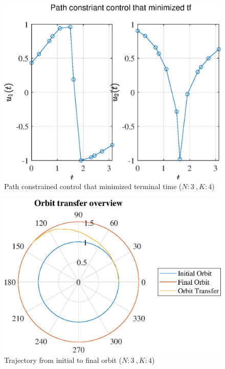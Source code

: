 \documentclass[]{article}
\begin{document}
	\begin{figure}
		\centering
		\includegraphics[scale=0.75]{path_N3_K4_C3_tf.eps}
		\caption{Path constrained control that minimized terminal time (\(N:3\ , K:4\))}
		\label{fig:path_N3_K4_C3_tf}
	\end{figure}
	\begin{figure}
		\centering
		\includegraphics[scale=0.75]{orbit_N3_K4_C3_tf.eps}
		\caption{Trajectory from initial to final orbit (\(N:3\ , K:4\))}
		\label{fig:orbit_N3_K4_C3_tf}
	\end{figure}
\end{document}
